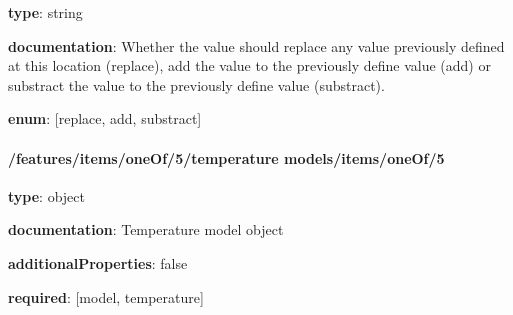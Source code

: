 \begin{itemized}
\item {\bf type}: string
\item {\bf documentation}: Whether the value should replace any value previously defined at this location (replace), add the value to the previously define value (add) or substract the value to the previously define value (substract).
\item {\bf enum}: [replace, add, substract]\end{itemized}\paragraph{/features/items/oneOf/5/temperature models/items/oneOf/5} \begin{itemized}
\item {\bf type}: object
\item {\bf documentation}: Temperature model object
\item {\bf additionalProperties}: false
\item {\bf required}: [model, temperature]\end{itemized}
